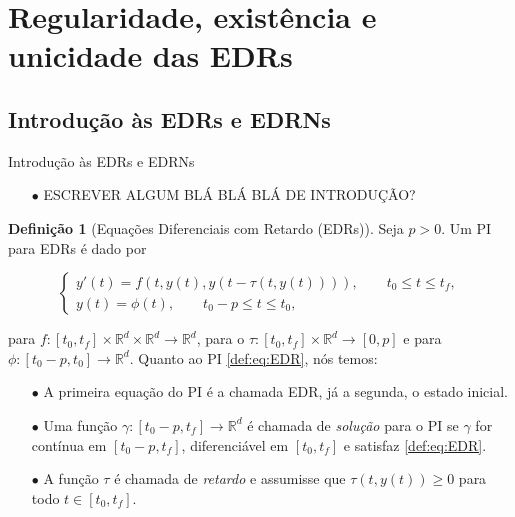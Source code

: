 \documentclass{beamer}
\newcommand{\R}{\mathbb{R}}
\theoremstyle{plain}
\theoremstyle{definition}
\newtheorem{defi}{Definição}
\begin{document}
\section{Regularidade, existência e unicidade das EDRs}
\subsection{Introdução às EDRs e EDRNs}

\begin{frame}{Introdução às EDRs e EDRNs}
    \begin{itemize}
        \item[$\bullet$] ESCREVER ALGUM BLÁ BLÁ BLÁ DE INTRODUÇÃO?
    \end{itemize} 
\end{frame}



\begin{frame}
    \small
    
    \begin{defi}[Equações Diferenciais com Retardo (EDRs)]
    Seja $p>0$. Um PI para EDRs é dado por

    \noindent
    \begin{equation}  
        \begin{cases}
            y'(t) = f(t, y(t), y(t - \tau(t, y(t)))), \qquad t_0 \leq t \leq t_f , \\
            y(t) = \phi(t), \qquad t_0 - p \leq t \leq t_0, 
        \end{cases}
        \label{def:eq:EDR}
    \end{equation}

para $f:[t_0, t_f] \times \R^d \times \R^d \to \R^d$, para {\color{red}o}  $\tau: [t_0, t_f] \times \R^d \to [0, p]$ e para $\phi:[t_0 - p, t_0] \to \R^d $. Quanto ao PI \eqref{def:eq:EDR}, nós temos:
        
    \begin{itemize}
        \item[$\bullet$] A primeira equação do PI é a chamada EDR, já a segunda, o estado inicial.
        \item[$\bullet$] Uma função $\gamma:[t_0 - p, t_f] \to \R^d$ é chamada de \textit{solução} para o PI se $\gamma$ for contínua em $[t_0 - p, t_f]$, diferenciável em $[t_0, t_f]$ e satisfaz \eqref{def:eq:EDR}.
        \item[$\bullet$] A função $\tau$ é chamada de \textit{retardo} e assumisse que $\tau(t, y(t))\geq0$ para todo $t \in [t_0, t_f]$.

    \end{itemize}
    \end{defi}


\end{frame}
\end{document}

